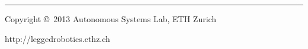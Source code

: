 \documentclass[10pt,landscape,a4paper]{article}
\makeatletter
\renewcommand{\subsubsection}{\@startsection{subsubsection}{3}{0mm}%
                                {-1ex plus -.5ex minus -.2ex}%
                                {1ex plus .2ex}%
                                {\normalfont\small\bfseries}}
\makeatother
\begin{document}
\begin{multicols}{2}
\begin{tabular}{@{}ll@{}}
\end{tabular}





\rule{0.3\linewidth}{0.25pt}
\scriptsize

Copyright \copyright\ 2013 Autonomous Systems Lab, ETH Zurich

http://leggedrobotics.ethz.ch


\end{multicols}
\end{document}

